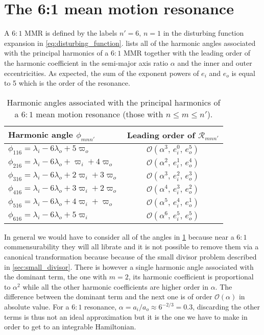 \section{The 6:1 mean motion resonance}
\label{sec:6_by_1_resonance}
A $6:1$ MMR is defined by the labels $n'=6,\,n=1$ in the disturbing
function expansion in \cref{eq:disturbing_function}. 
lists all of the harmonic angles associated with the principal
harmonics of a $6:1$ MMR together with the leading order of the
harmonic coefficient in the semi-major axis ratio $\alpha$ and
the inner and outer eccentricities. As expected, the sum of the
exponent powers of $e_i$ and $e_o$ is equal to 5 which is the order
of the resonance.
\begin{table}[h!]
\centering
\begin{tabular}{l c}
\toprule
    Harmonic angle $\phi_{mnn'}$ & Leading order of $\mathcal{R}_{mnn'}$\\
\midrule
    $\phi_{116}=\lambda_i-6\lambda_o+5\varpi_o$ & 
    $\mathcal{O}(\alpha^3,\,e_i^0,\,e_o^5)$\\
$\phi_{216}=\lambda_i-6\lambda_o+\varpi_i + 4\varpi_o$ & 
    $\mathcal{O}(\alpha^2,\,e_i^1,\,e_o^4)$\\
$\phi_{316}=\lambda_i-6\lambda_o+2\varpi_i + 3\varpi_o$ & 
    $\mathcal{O}(\alpha^3,\,e_i^2,\,e_o^3)$\\
$\phi_{416}=\lambda_i-6\lambda_o+3\varpi_i + 2\varpi_o$ & 
    $\mathcal{O}(\alpha^4,\,e_i^3,\,e_o^2)$\\
$\phi_{516}=\lambda_i-6\lambda_o+4\varpi_i + \varpi_o$ & 
    $\mathcal{O}(\alpha^5,\,e_i^4,\,e_o^1)$\\
$\phi_{616}=\lambda_i-6\lambda_o+5\varpi_i  $ & 
    $\mathcal{O}(\alpha^6,\,e_i^5,\,e_o^5)$\\
\bottomrule
\end{tabular}
\caption{Harmonic angles associated with the principal harmonics
    of a $6:1$ mean motion resonance (those with $n\leq m\leq n'$).}
\label{tab:6_1_angles}
\end{table}

In general we would have to consider all of the angles in \cref{tab:6_1_angles}
because near a $6:1$ commensurability they will all librate and it is not possible
to remove them via a canonical transformation because because of the small
divisor problem described in \cref{sec:small_divisor}.
There is however a single harmonic angle associated with the dominant term, the one with 
$m=2$, its harmonic coefficient is proportional to $\alpha^2$
while all the other harmonic coefficients
are higher order in $\alpha$. The difference between the dominant term and the 
next one is of order $\mathcal{O}(\alpha)$ in absolute value. For a $6:1$ resonance, 
$\alpha=a_i/a_o\approx 6^{-2/3}=0.3$, discarding the other terms is thus
not an ideal approximation but it is the one we have to make in order to get to 
an integrable Hamiltonian. 

